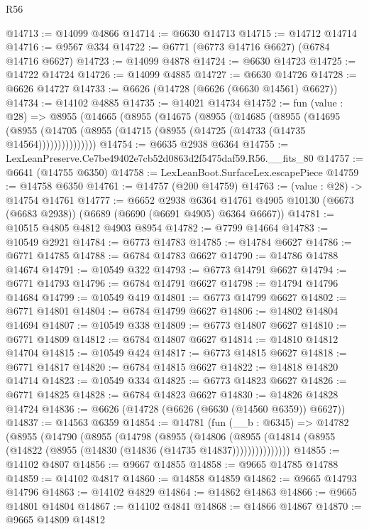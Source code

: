 \begin{lexlean}{R56}
\begin{coremodule}
@14713 := @14099 @4866
@14714 := @6630 @14713
@14715 := @14712 @14714
@14716 := @9567 @334
@14722 := @6771 (@6773 @14716 @6627) (@6784 @14716 @6627)
@14723 := @14099 @4878
@14724 := @6630 @14723
@14725 := @14722 @14724
@14726 := @14099 @4885
@14727 := @6630 @14726
@14728 := @6626 @14727
@14733 := @6626 (@14728 (@6626 (@6630 @14561) @6627))
@14734 := @14102 @4885
@14735 := @14021 @14734
@14752 := fun (value : @28) =>
  @8955
    (@14665
      (@8955
        (@14675
          (@8955
            (@14685
              (@8955
                (@14695
                  (@8955 (@14705 (@8955 (@14715 (@8955 (@14725 (@14733 (@14735 @14564)))))))))))))))
@14754 := @6635 @2938 @6364
@14755 := LexLeanPreserve.Ce7be49402e7cb52d0863d2f5475daf59.R56.__fits_80
@14757 := @6641 (@14755 @6350)
@14758 := LexLeanBoot.SurfaceLex.escapePiece
@14759 := @14758 @6350
@14761 := @14757 (@200 @14759)
@14763 := (value : @28) -> @14754 @14761
@14777 := @6652
    @2938
    @6364
    @14761
    @4905
    @10130
    (@6673 (@6683 @2938))
    (@6689 (@6690 (@6691 @4905) @6364 @6667))
@14781 := @10515 @4805 @4812 @4903 @8954
@14782 := @7799 @14664
@14783 := @10549 @2921
@14784 := @6773 @14783
@14785 := @14784 @6627
@14786 := @6771 @14785
@14788 := @6784 @14783 @6627
@14790 := @14786 @14788 @14674
@14791 := @10549 @322
@14793 := @6773 @14791 @6627
@14794 := @6771 @14793
@14796 := @6784 @14791 @6627
@14798 := @14794 @14796 @14684
@14799 := @10549 @419
@14801 := @6773 @14799 @6627
@14802 := @6771 @14801
@14804 := @6784 @14799 @6627
@14806 := @14802 @14804 @14694
@14807 := @10549 @338
@14809 := @6773 @14807 @6627
@14810 := @6771 @14809
@14812 := @6784 @14807 @6627
@14814 := @14810 @14812 @14704
@14815 := @10549 @424
@14817 := @6773 @14815 @6627
@14818 := @6771 @14817
@14820 := @6784 @14815 @6627
@14822 := @14818 @14820 @14714
@14823 := @10549 @334
@14825 := @6773 @14823 @6627
@14826 := @6771 @14825
@14828 := @6784 @14823 @6627
@14830 := @14826 @14828 @14724
@14836 := @6626 (@14728 (@6626 (@6630 (@14560 @6359)) @6627))
@14837 := @14563 @6359
@14854 := @14781
    (fun (__b : @6345) =>
    @14782
      (@8955
        (@14790
          (@8955
            (@14798
              (@8955
                (@14806
                  (@8955 (@14814 (@8955 (@14822 (@8955 (@14830 (@14836 (@14735 @14837)))))))))))))))
@14855 := @14102 @4807
@14856 := @9667 @14855
@14858 := @9665 @14785 @14788
@14859 := @14102 @4817
@14860 := @14858 @14859
@14862 := @9665 @14793 @14796
@14863 := @14102 @4829
@14864 := @14862 @14863
@14866 := @9665 @14801 @14804
@14867 := @14102 @4841
@14868 := @14866 @14867
@14870 := @9665 @14809 @14812

\end{coremodule}
\end{lexlean}

